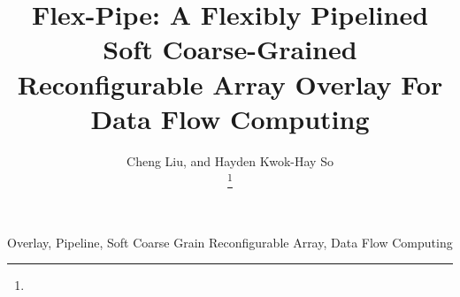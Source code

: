 \documentclass[journal]{IEEEtran}
\begin{document}
\title{Flex-Pipe: A Flexibly Pipelined Soft Coarse-Grained Reconfigurable Array Overlay For Data Flow Computing}
\author{Cheng Liu,
and Hayden Kwok-Hay So%

\thanks{}
}
\maketitle

\begin{abstract}
    
\end{abstract}

\begin{IEEEkeywords}
    Overlay, Pipeline, Soft Coarse Grain Reconfigurable Array, Data Flow Computing
\end{IEEEkeywords}











\end{document}
